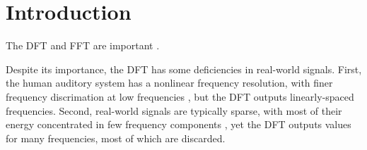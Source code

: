 \documentclass[letter,12pt,notitlepage]{article}
\title{\ThesisTitle}
\author{\vspace{1em}\\Sevag Hanssian \\
  McGill University \\
 \small{\texttt{sevag.hanssian@mail.mcgill.ca}} \\
 \small{\texttt{sevagh@protonmail.com}} \\\ \\\ \\
 \small{Thesis for Master of Arts in Music Technology}\\
 \small{April 1, 2021}}
\date{}
\begin{document}
\maketitle

\vspace{3.5em}

\begin{abstract}
	The discrete Fourier transform (DFT), and the Fast Fourier Transform (FFT) algorithm for its efficient computation, rank among the most important algorithms in applied engineering and computer science. The DFT is used in digital signal processing applications to decompose a discrete-time acoustic signal into a sum of its frequency components, generating a spectrum to perform what is known as spectral or frequency analysis. This Master's thesis first proposes to describe and implement the DFT, FFT, and their sparse, pruned, nonuniform, warped, and fractional variants. Next, the use of the standard DFT and FFT in real-world music systems will be revisited to explore whether using the variants can be beneficial. The main result achieved is that a combination of several of the variants showed a simultaneous reduction in computational footprint and improvement in accuracy in a recent state-of-the-art music system.
\end{abstract}

\vfill
\clearpage %

\tableofcontents

\vfill
\clearpage %

\listoffigures

\listoflistings

\vfill
\clearpage %

\section{Introduction}
\label{sec:intro}

The DFT and FFT \cite{cooleytukey} are important \cite{dftimportant}.

   Despite its importance, the DFT has some deficiencies in real-world signals. First, the human auditory system has a nonlinear frequency resolution, with finer frequency discrimation at low frequencies , but the DFT outputs linearly-spaced frequencies. Second, real-world signals are typically sparse, with most of their energy concentrated in few frequency components \cite{sparseintro}, yet the DFT outputs values for many frequencies, most of which are discarded.
\end{document}
